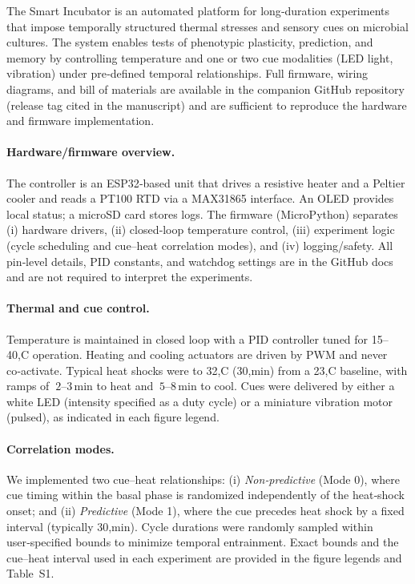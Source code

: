 \documentclass[aps,pre,twocolumn,floatfix,nofootinbib,amsmath,amssymb]{revtex4-2}
\begin{document}
The Smart Incubator is an automated platform for long‑duration experiments that impose temporally structured thermal stresses and sensory cues on microbial cultures. The system enables tests of phenotypic plasticity, prediction, and memory by controlling temperature and one or two cue modalities (LED light, vibration) under pre‑defined temporal relationships. Full firmware, wiring diagrams, and bill of materials are available in the companion GitHub repository (release tag cited in the manuscript) and are sufficient to reproduce the hardware and firmware implementation.

\paragraph{Hardware/firmware overview.} The controller is an ESP32‑based unit that drives a resistive heater and a Peltier cooler and reads a PT100 RTD via a MAX31865 interface. An OLED provides local status; a microSD card stores logs. The firmware (MicroPython) separates (i) hardware drivers, (ii) closed‑loop temperature control, (iii) experiment logic (cycle scheduling and cue–heat correlation modes), and (iv) logging/safety. All pin‑level details, PID constants, and watchdog settings are in the GitHub docs and are not required to interpret the experiments.

\paragraph{Thermal and cue control.} Temperature is maintained in closed loop with a PID controller tuned for 15–40,\textdegree C operation. Heating and cooling actuators are driven by PWM and never co‑activate. Typical heat shocks were to 32,\textdegree C (30,min) from a 23,\textdegree C baseline, with ramps of $~2\!\text{–}\!3\,\text{min}$ to heat and $~5\!\text{–}\!8\,\text{min}$ to cool. Cues were delivered by either a white LED (intensity specified as a duty cycle) or a miniature vibration motor (pulsed), as indicated in each figure legend.

\paragraph{Correlation modes.} We implemented two cue–heat relationships: (i) \emph{Non‑predictive} (Mode 0), where cue timing within the basal phase is randomized independently of the heat‑shock onset; and (ii) \emph{Predictive} (Mode 1), where the cue precedes heat shock by a fixed interval (typically 30,min). Cycle durations were randomly sampled within user‑specified bounds to minimize temporal entrainment. Exact bounds and the cue–heat interval used in each experiment are provided in the figure legends and Table~S1.
\end{document}
